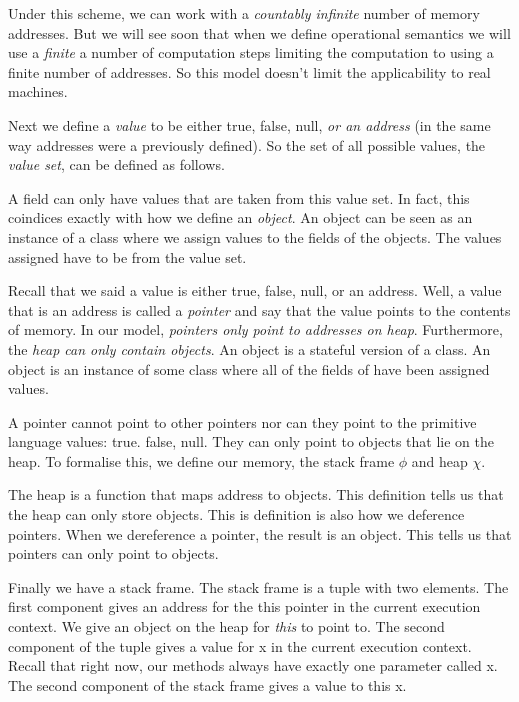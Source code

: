 
Under this scheme, we can work with a \textit{countably infinite} 
number of memory addresses. 
But we will see soon that when we define operational semantics
we will use a \textit{finite} a number of computation 
steps limiting the computation to using a finite number of addresses. 
So this model doesn't limit the applicability to real machines.

Next we define a \textit{value} to be either true, false, null, \textit{or 
an address} (in the same way addresses were a previously defined). 
So the set of all possible values, 
the \textit{value set}, can be defined as follows.


A field can only have values that are taken from this value set. 
In fact, this coindices exactly with how we define an \textit{object}. 
An object can be seen as an instance 
of a class where we assign values to the fields of the objects. 
The values assigned have to be from the value set.


Recall that we said a value is either true, false, null, or 
an address. Well, a value that is an address is called a
 \textit{pointer} and say that the value points to the contents of memory.
In our model, \textit{pointers only point to addresses on heap}. 
Furthermore, the \textit{heap can only contain objects}. 
An object is a stateful version of a class. 
An object is an instance of some class where all of the fields of have been assigned values. 


A pointer cannot point to other pointers nor can they point 
to the primitive language values: true. false, null. 
They can only point to objects that lie on the heap.
To formalise this, we define our memory, the stack 
frame $\phi$ and heap $\chi$.


The heap is a function that maps address to objects. 
This definition tells us that the heap can only store objects. 
This is definition is also how we deference pointers. When we 
dereference a pointer, the result is an object. This tells us that 
pointers can only point to objects.

Finally we have a stack frame.
The stack frame is a tuple with two elements. The first component gives an address for the this
pointer in the current execution context. We give an object on the heap for \textit{this} 
to point to. The second component of the tuple gives a value for x in the 
current execution context. Recall that right now, our methods always have exactly
one parameter called x. The second component of the stack frame gives a value to this x. 

